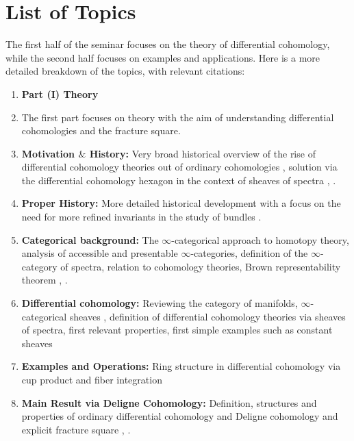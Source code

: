 \documentclass[10pt]{amsart}
\begin{document}
\section{List of Topics}
The first half of the seminar focuses on the theory of differential cohomology, while the second half focuses on examples and applications.
Here is a more detailed breakdown of the topics, with relevant citations:
\begin{enumerate}[itemsep=0.3cm]
	\item[] \textbf{\large Part (I) Theory}
	\item[] The first part focuses on theory with the aim of understanding differential cohomologies and the fracture square. 
	\item \textbf{Motivation $\&$ History:} Very broad historical overview of the rise of differential cohomology theories out of ordinary cohomologies \cite{hopkinssinger2005diffcoh,simonssullivan2008diffcoh,stimpson2011diffcoh}, solution via the differential cohomology hexagon in the context of sheaves of spectra \cite[Section 2]{adh2021differentialcohomology}, \cite{debray2023diffcoh}.
	\item \textbf{Proper History:} More detailed historical development with a focus on the need for more refined invariants in the study of bundles \cite{hopkinssinger2005diffcoh,simonssullivan2008diffcoh,stimpson2011diffcoh}.
	\item \textbf{Categorical background:} The $\infty$-categorical approach to homotopy theory, analysis of accessible and presentable $\infty$-categories, definition of the $\infty$-category of spectra, relation to cohomology theories, Brown representability theorem \cite[Section 1]{lurie2017ha}, \cite{groth2010inftycats}.
	\item \textbf{Differential cohomology:} Reviewing the category of manifolds, $\infty$-categorical sheaves \cite[Section 6]{lurie2009htt}, definition of differential cohomology theories via sheaves	of spectra, first relevant properties, first simple examples such as constant sheaves \cite[Section 2]{adh2021differentialcohomology}
	\item \textbf{Examples and Operations:} Ring structure in differential cohomology via cup product \cite[Section 8]{adh2021differentialcohomology} and fiber integration \cite[Section 9]{adh2021differentialcohomology}
	\item \textbf{Main Result via Deligne Cohomology:} Definition, structures and properties of ordinary differential cohomology and Deligne cohomology and explicit fracture square \cite[Sections 6, 7]{adh2021differentialcohomology}, \cite{bunkenikolausvoelkl2016diffcoh}. 

\end{enumerate}
\end{document}
